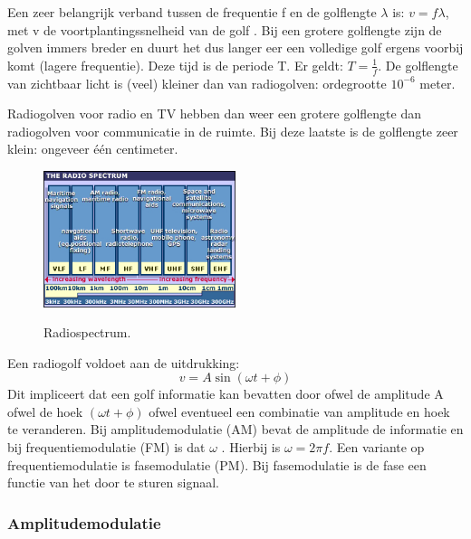 Een zeer belangrijk verband tussen de frequentie f en de golflengte $\lambda$ is: $v = f\lambda$, met v de voortplantingssnelheid van de golf \cite{elektromagnetischestraling}. Bij een grotere golflengte zijn de golven immers breder en duurt het dus langer eer een volledige golf ergens voorbij komt (lagere frequentie). Deze tijd is de periode T. Er geldt: $T = \frac{1}{f}$. De golflengte van zichtbaar licht is (veel) kleiner dan van radiogolven: ordegrootte $10^{-6}$ meter.

Radiogolven voor radio en TV hebben dan weer een grotere golflengte dan radiogolven voor communicatie in de ruimte. Bij deze laatste  is de golflengte zeer klein: ongeveer één centimeter.

\begin{figure}[ht]
  \centering
  \includegraphics[width=0.5\textwidth]{voorbeeld_figuren/radiospectrum}
  \caption{Radiospectrum.}
  \cite{wavelengths}
  \label{fig:radiospectrum}
\end{figure}

Een radiogolf voldoet aan de uitdrukking:
\begin{equation*} %
v = A\sin(\omega t+\phi)
\end{equation*}	%
Dit impliceert dat een golf informatie kan bevatten door ofwel de amplitude A ofwel de hoek $(\omega t+\phi)$ ofwel eventueel een combinatie van amplitude en hoek te veranderen. Bij amplitudemodulatie (AM) bevat de amplitude de informatie en bij frequentiemodulatie (FM) is dat $\omega$ \cite{radiowaves1}.  Hierbij is $\omega = 2\pi f$. Een variante op frequentiemodulatie is fasemodulatie (PM). Bij fasemodulatie is de fase een functie van het door te sturen signaal.

\subsubsection{Amplitudemodulatie}

